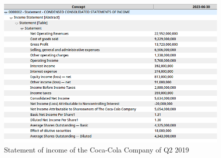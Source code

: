 \begin{figure}[H]
    \centering
    \includegraphics[width=\textwidth]{images/coca_cola_2019_q2.png}
    \caption{Statement of income of the Coca-Cola Company of Q2 2019}
    \label{fig:coca_cola_2019_q2}
\end{figure}





